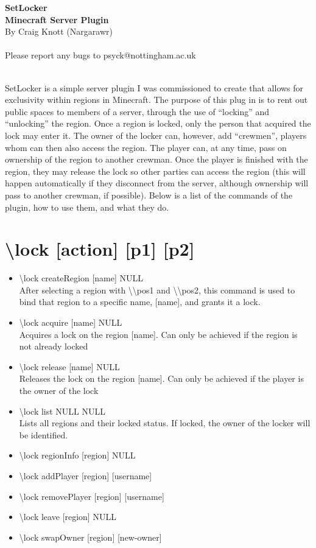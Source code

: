 \documentclass[a4paper,twoside,notitlepage,11pt]{article}
\newcommand{\nin}{\noindent}
\begin{document}
\begin{center}
   \textbf{SetLocker\ \\Minecraft Server Plugin} \ \\
   By Craig Knott (Nargarawr) \ \\
   \ \\
   Please report any bugs to psyck@nottingham.ac.uk
\end{center}
\ \\
\nin
SetLocker is a simple server plugin I was commissioned to create that allows for exclusivity within regions in Minecraft. The purpose of this plug in is to rent out public spaces to members of a server, through the use of ``locking'' and ``unlocking'' the region. Once a region is locked, only the person that acquired the lock may enter it. The owner of the locker can, however, add ``crewmen'', players whom can then also access the region. The player can, at any time, pass on ownership of the region to another crewman. Once the player is finished with the region, they may release the lock so other parties can access the region (this will happen automatically if they disconnect from the server, although ownership will pass to another crewman, if possible). Below is a list of the commands of the plugin, how to use them, and what they do.

\section{\textbackslash lock [action] [p1] [p2]}
\begin{itemize}
\item \textbackslash lock createRegion [name] NULL\\
After selecting a region with \textbackslash\textbackslash pos1 and \textbackslash\textbackslash pos2, this command is used to bind that region to a specific name, [name], and grants it a lock.
\item \textbackslash lock acquire [name] NULL\\
Acquires a lock on the region [name]. Can only be achieved if the region is not already locked
\item \textbackslash lock release [name] NULL\\
Releases the lock on the region [name]. Can only be achieved if the player is the owner of the lock
\item \textbackslash lock list NULL NULL\\
Lists all regions and their locked status. If locked, the owner of the locker will be identified.
\item \textbackslash lock regionInfo [region] NULL\\
\item \textbackslash lock addPlayer [region] [username]\\
\item \textbackslash lock removePlayer [region] [username]\\
\item \textbackslash lock leave [region] NULL\\
\item \textbackslash lock swapOwner [region] [new-owner]\\
\end{itemize}
\end{document}
